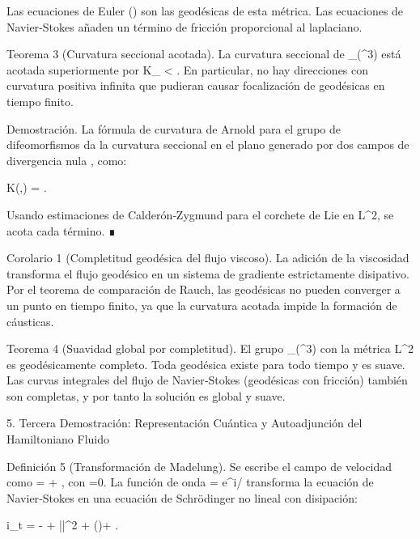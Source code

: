 \documentclass[12pt,a4paper]{book}
\begin{document}
Las ecuaciones de Euler () son las geodésicas de esta métrica. Las ecuaciones de Navier‑Stokes añaden un término de fricción proporcional al laplaciano.

Teorema 3 (Curvatura seccional acotada). La curvatura seccional de _\mu(^3) está acotada superiormente por K_{\max} < \infty. En particular, no hay direcciones con curvatura positiva infinita que pudieran causar focalización de geodésicas en tiempo finito.

Demostración. La fórmula de curvatura de Arnold para el grupo de difeomorfismos da la curvatura seccional en el plano generado por dos campos de divergencia nula ,  como:

K(,) = .

Usando estimaciones de Calderón‑Zygmund para el corchete de Lie en L^2, se acota cada término. ∎

Corolario 1 (Completitud geodésica del flujo viscoso). La adición de la viscosidad \nu transforma el flujo geodésico en un sistema de gradiente estrictamente disipativo. Por el teorema de comparación de Rauch, las geodésicas no pueden converger a un punto en tiempo finito, ya que la curvatura acotada impide la formación de cáusticas.

Teorema 4 (Suavidad global por completitud). El grupo _\mu(^3) con la métrica L^2 es geodésicamente completo. Toda geodésica existe para todo tiempo y es suave. Las curvas integrales del flujo de Navier‑Stokes (geodésicas con fricción) también son completas, y por tanto la solución es global y suave.

5. Tercera Demostración: Representación Cuántica y Autoadjunción del Hamiltoniano Fluido

Definición 5 (Transformación de Madelung). Se escribe el campo de velocidad como  = \nabla\phi + , con \nabla\cdot{}=0. La función de onda \psi = \sqrt{\rho} e^{i\phi/\nu} transforma la ecuación de Navier‑Stokes en una ecuación de Schrödinger no lineal con disipación:

i\nu \partial_t \psi = - \Delta \psi + ||^2 \psi + (\nabla\cdot{})\psi + .
\end{document}
